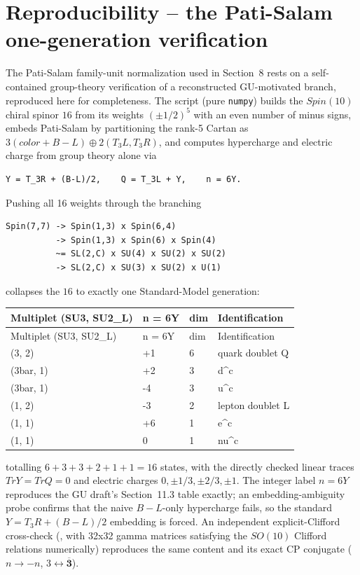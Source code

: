 \documentclass[11pt]{article}
\theoremstyle{remark}
\begin{document}
\section{Reproducibility -- the Pati-Salam one-generation verification}
The Pati-Salam family-unit normalization used in Section~8 rests on a self-contained group-theory verification of a reconstructed GU-motivated branch, reproduced here for completeness. The script  (pure \texttt{numpy}) builds the $Spin(10)$ chiral spinor $16$ from its weights $(\pm1/2)^5$ with an even number of minus signs, embeds Pati-Salam by partitioning the rank-5 Cartan as $3 (color + B-L) \oplus 2 (T_3L, T_3R)$, and computes hypercharge and electric charge from group theory alone via

\begin{lstlisting}
Y = T_3R + (B-L)/2,    Q = T_3L + Y,    n = 6Y.
\end{lstlisting}
Pushing all 16 weights through the branching

\begin{lstlisting}
Spin(7,7) -> Spin(1,3) x Spin(6,4)
          -> Spin(1,3) x Spin(6) x Spin(4)
          ~= SL(2,C) x SU(4) x SU(2) x SU(2)
          -> SL(2,C) x SU(3) x SU(2) x U(1)
\end{lstlisting}
collapses the $16$ to exactly one Standard-Model generation:

{\small
\begin{longtable}{P{0.14\textwidth}P{0.24\textwidth}P{0.24\textwidth}P{0.24\textwidth}}
\toprule
Multiplet (SU3, SU2\_L) & n = 6Y & dim & Identification \\
\midrule
\endfirsthead
\toprule
Multiplet (SU3, SU2\_L) & n = 6Y & dim & Identification \\
\midrule
\endhead
(3, 2) & +1 & 6 & quark doublet Q \\
(3bar, 1) & +2 & 3 & d\textasciicircum{}c \\
(3bar, 1) & -4 & 3 & u\textasciicircum{}c \\
(1, 2) & -3 & 2 & lepton doublet L \\
(1, 1) & +6 & 1 & e\textasciicircum{}c \\
(1, 1) & 0 & 1 & nu\textasciicircum{}c \\
\bottomrule
\end{longtable}
}
totalling $6 + 3 + 3 + 2 + 1 + 1 = 16$ states, with the directly checked linear traces $Tr Y = Tr Q = 0$ and electric charges ${0, \pm1/3, \pm2/3, \pm1}$. The integer label $n = 6Y$ reproduces the GU draft's Section~11.3 table exactly; an embedding-ambiguity probe confirms that the naive $B-L$-only hypercharge fails, so the standard $Y = T_3R + (B-L)/2$ embedding is forced. An independent explicit-Clifford cross-check (, with 32x32 gamma matrices satisfying the $SO(10)$ Clifford relations numerically) reproduces the same content and its exact CP conjugate ($n \to -n$, $3 \leftrightarrow \overline{\mathbf{3}}$).
\end{document}

